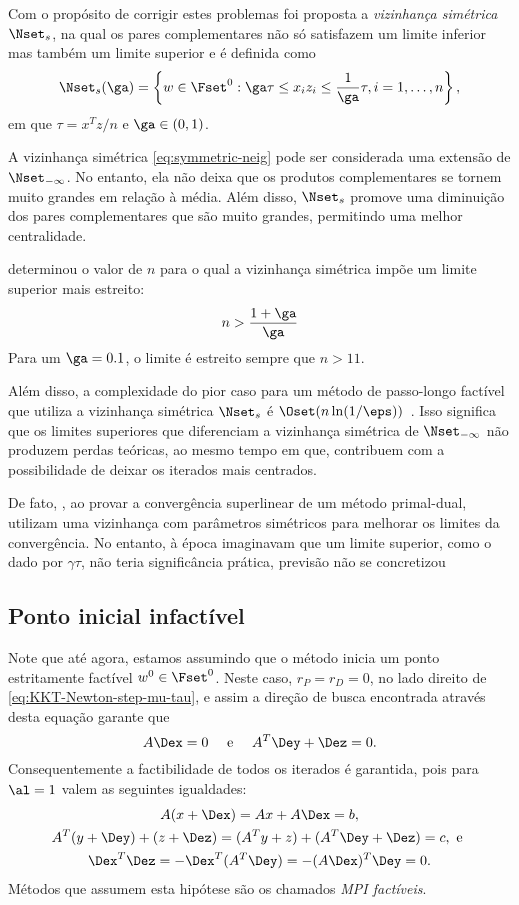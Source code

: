 Com o propósito de corrigir estes problemas foi proposta a \emph{vizinhança
simétrica} $\Nset_s$, na qual os pares complementares não só satisfazem um limite inferior
mas também um limite superior e é definida como
\begin{equation}
\label{eq:symmetric-neig}
\Nset_s(\ga) = \left\{w\in\Fset^0 : \ga\tau \leq x_iz_i \leq
\frac{1}{\ga}\tau, i=1,\dotsc,n \right\},
\end{equation}
em que $\tau = x^Tz/n$ e $\ga\in(0,1)$.

A vizinhança simétrica \eqref{eq:symmetric-neig}  pode ser considerada uma
extensão de $\Nset_{-\infty}$. No entanto, ela não deixa que os
produtos complementares se tornem muito grandes em relação à média. Além disso, $\Nset_s$ promove uma diminuição dos
pares complementares que são muito grandes, permitindo uma melhor centralidade. 


\citet{Colombo:2008wm}
determinou o valor de $n$ para o qual a vizinhança simétrica impõe um limite
superior mais estreito:
\[
n> \frac{1+\ga}{\ga}
\]
Para um $\ga=0.1$, o limite é estreito sempre que $n>11$. 

Além disso, a complexidade do pior caso  para um método de passo-longo factível
que utiliza a vizinhança simétrica $\Nset_s$ é $\Oset(n\ln(1/\eps))$~\cite{Colombo:2008ia}.
Isso significa que  os limites superiores que diferenciam a vizinhança simétrica
de $\Nset_{-\infty}$ não produzem perdas teóricas, ao mesmo tempo em que,
contribuem com  a possibilidade de deixar os iterados mais centrados.
  
  
De fato, \citet{Zhang:1993gn}, ao provar a convergência superlinear de um método
primal-dual, utilizam uma vizinhança com parâmetros simétricos para melhorar os
limites da convergência. No entanto, à época imaginavam que um limite superior,
como o dado por $\gamma\tau$,  não teria significância prática, previsão não se
concretizou~\cite{Gondzio:1996uw,Colombo:2008wm,Colombo:2008ia}

\subsection{Ponto inicial infactível}
\label{sec:infeasible_inicial_point}

Note que até agora, estamos assumindo que o método inicia  um ponto estritamente
factível $w^0 \in \Fset^0$. Neste caso, $r_P = r_D = 0$, no lado
direito de \eqref{eq:KKT-Newton-step-mu-tau}, e assim a direção de busca
encontrada através desta equação garante que
\begin{equation}
\label{eq:fact-direction}
A\Dex = 0 \quad \text{ e } \quad A^T\Dey + \Dez = 0.
\end{equation}
Consequentemente a factibilidade de todos os iterados é garantida, pois para
$\al =1$ valem as seguintes igualdades:
\begin{gather*}
A(x + \Dex) = Ax + A\Dex = b, \\
A^T(y+\Dey) + (z + \Dez) = (A^Ty + z) + (A^T\Dey + \Dez) = c, \text{ e }\\
\Dex^T \Dez  = - \Dex^T (A^T\Dey) = - (A\Dex)^T\Dey = 0.
\end{gather*}
Métodos que assumem esta hipótese são os chamados \emph{\ac{MPI} factíveis}. 

